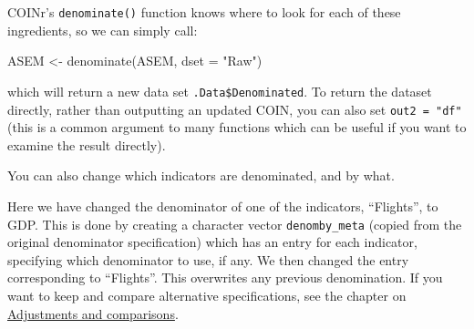 \documentclass[
]{book}
\newenvironment{Shaded}{\begin{snugshade}}{\end{snugshade}}
\newcommand{\AttributeTok}[1]{\textcolor[rgb]{0.77,0.63,0.00}{#1}}
\newcommand{\CommentTok}[1]{\textcolor[rgb]{0.56,0.35,0.01}{\textit{#1}}}
\newcommand{\FunctionTok}[1]{\textcolor[rgb]{0.00,0.00,0.00}{#1}}
\newcommand{\NormalTok}[1]{#1}
\newcommand{\OtherTok}[1]{\textcolor[rgb]{0.56,0.35,0.01}{#1}}
\newcommand{\SpecialCharTok}[1]{\textcolor[rgb]{0.00,0.00,0.00}{#1}}
\newcommand{\StringTok}[1]{\textcolor[rgb]{0.31,0.60,0.02}{#1}}
\begin{document}
COINr's \texttt{denominate()} function knows where to look for each of these ingredients, so we can simply call:

\begin{Shaded}
\begin{Highlighting}[]
\NormalTok{ASEM }\OtherTok{\textless{}{-}} \FunctionTok{denominate}\NormalTok{(ASEM, }\AttributeTok{dset =} \StringTok{"Raw"}\NormalTok{)}
\end{Highlighting}
\end{Shaded}

which will return a new data set \texttt{.Data\$Denominated}. To return the dataset directly, rather than outputting an updated COIN, you can also set \texttt{out2\ =\ "df"} (this is a common argument to many functions which can be useful if you want to examine the result directly).

You can also change which indicators are denominated, and by what.

\begin{Shaded}
\end{Shaded}

Here we have changed the denominator of one of the indicators, ``Flights'', to GDP. This is done by creating a character vector \texttt{denomby\_meta} (copied from the original denominator specification) which has an entry for each indicator, specifying which denominator to use, if any. We then changed the entry corresponding to ``Flights''. This overwrites any previous denomination. If you want to keep and compare alternative specifications, see the chapter on \protect\hyperlink{adjustments-and-comparisons}{Adjustments and comparisons}.
\end{document}
